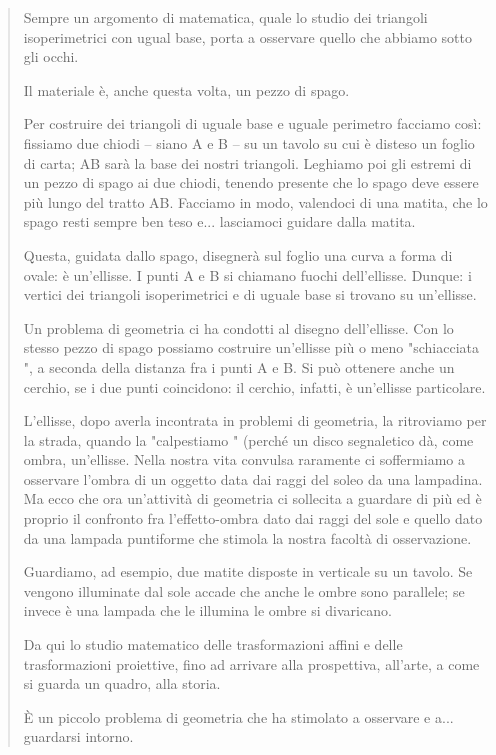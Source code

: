 \begin{quote}
Sempre un argomento di matematica, quale lo studio dei triangoli isoperimetrici con ugual base, porta a osservare quello che abbiamo sotto gli occhi. 

Il materiale è, anche questa volta, un pezzo di spago.

Per costruire dei triangoli di uguale base e uguale perimetro facciamo così: fissiamo due chiodi – siano A e B – su un tavolo su cui è disteso un foglio di carta; AB sarà la base dei nostri triangoli. Leghiamo poi gli estremi di un pezzo di spago ai due chiodi, tenendo presente che lo spago deve essere più lungo del tratto AB. Facciamo in modo, valendoci di una matita, che lo spago resti sempre ben teso e... lasciamoci guidare dalla matita.

Questa, guidata dallo spago, disegnerà sul foglio una curva a forma di ovale: è un'ellisse. I punti A e B si chiamano fuochi dell'ellisse. Dunque: i vertici dei triangoli isoperimetrici e di uguale base si trovano su un'ellisse.

Un problema di geometria ci ha condotti al disegno dell'ellisse. Con lo stesso pezzo di spago possiamo costruire un'ellisse più o meno  "schiacciata ", a seconda della distanza fra i punti A e B. Si può ottenere anche un cerchio, se i due punti coincidono: il cerchio, infatti, è un'ellisse particolare.    

L'ellisse, dopo averla incontrata in problemi di geometria, la ritroviamo per la strada, quando la  "calpestiamo " (perché un disco segnaletico dà, come ombra, un'ellisse. Nella nostra vita convulsa raramente ci soffermiamo a osservare l'ombra di un oggetto data dai raggi del soleo da una lampadina. Ma ecco che ora un'attività di geometria ci sollecita a guardare di più ed è proprio il confronto fra l'effetto-ombra dato dai raggi del sole e quello dato da una lampada puntiforme che stimola la nostra facoltà di osservazione. 

Guardiamo, ad esempio, due matite disposte in verticale su un tavolo. Se vengono illuminate dal sole accade che anche le ombre sono parallele; se invece è una lampada che le illumina le ombre si divaricano.

Da qui lo studio matematico delle trasformazioni affini e delle trasformazioni proiettive, fino ad arrivare alla prospettiva, all'arte, a come si guarda un quadro, alla storia.

È un piccolo problema di geometria che ha stimolato a osservare e a... guardarsi intorno.


\end{quote}
